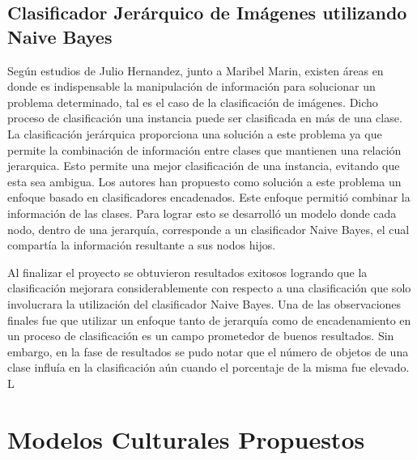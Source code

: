 \documentclass[sigconf]{acmart}
\begin{document}
\subsection{Clasificador Jerárquico de Imágenes utilizando Naive Bayes}
Según estudios de Julio Hernandez, junto a Maribel Marin, existen áreas en donde es
indispensable la manipulación de información para solucionar un
problema determinado, tal es el caso de la clasificación de imágenes.
Dicho proceso de clasificación una instancia puede ser clasificada en
más de una clase. La clasificación jerárquica proporciona una solución
a este problema ya que permite la combinación de información entre
clases que mantienen una relación jerarquica. Esto permite una mejor
clasificación de una instancia, evitando que esta sea ambigua. Los autores han propuesto como solución a este problema un enfoque basado en clasificadores encadenados. Este enfoque
permitió combinar la información de las clases. Para lograr esto
se desarrolló un modelo donde cada nodo, dentro de una jerarquía,
corresponde a un clasificador Naive Bayes, el cual compartía la
información resultante a sus nodos hijos.

Al finalizar el proyecto se obtuvieron resultados exitosos logrando que la clasificación mejorara considerablemente con respecto a una clasificación que solo involucrara la utilización del clasificador Naive Bayes. Una de las observaciones finales fue que utilizar un enfoque tanto de jerarquía como de encadenamiento en un proceso
de clasificación es un campo prometedor de buenos resultados. Sin embargo, en la fase de resultados se pudo notar que el número de objetos de una clase influía en la clasificación aún cuando el porcentaje de la misma fue elevado. L\citep{Noe}



\section{Modelos Culturales Propuestos}
\end{document}
